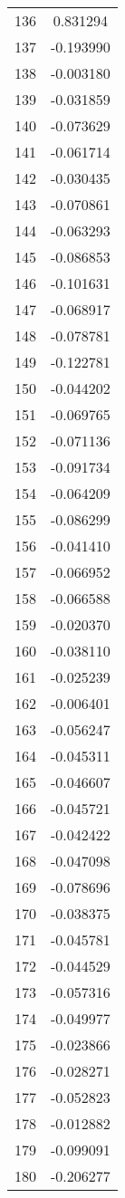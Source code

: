 \documentclass[12pt]{article}
\begin{document}
\begin{longtable}{@{}cc@{}}
136 & 0.831294 \\
137 & -0.193990 \\
138 & -0.003180 \\
139 & -0.031859 \\
140 & -0.073629 \\
141 & -0.061714 \\
142 & -0.030435 \\
143 & -0.070861 \\
144 & -0.063293 \\
145 & -0.086853 \\
146 & -0.101631 \\
147 & -0.068917 \\
148 & -0.078781 \\
149 & -0.122781 \\
150 & -0.044202 \\
151 & -0.069765 \\
152 & -0.071136 \\
153 & -0.091734 \\
154 & -0.064209 \\
155 & -0.086299 \\
156 & -0.041410 \\
157 & -0.066952 \\
158 & -0.066588 \\
159 & -0.020370 \\
160 & -0.038110 \\
161 & -0.025239 \\
162 & -0.006401 \\
163 & -0.056247 \\
164 & -0.045311 \\
165 & -0.046607 \\
166 & -0.045721 \\
167 & -0.042422 \\
168 & -0.047098 \\
169 & -0.078696 \\
170 & -0.038375 \\
171 & -0.045781 \\
172 & -0.044529 \\
173 & -0.057316 \\
174 & -0.049977 \\
175 & -0.023866 \\
176 & -0.028271 \\
177 & -0.052823 \\
178 & -0.012882 \\
179 & -0.099091 \\
180 & -0.206277 \\

\end{longtable}
\end{document}
